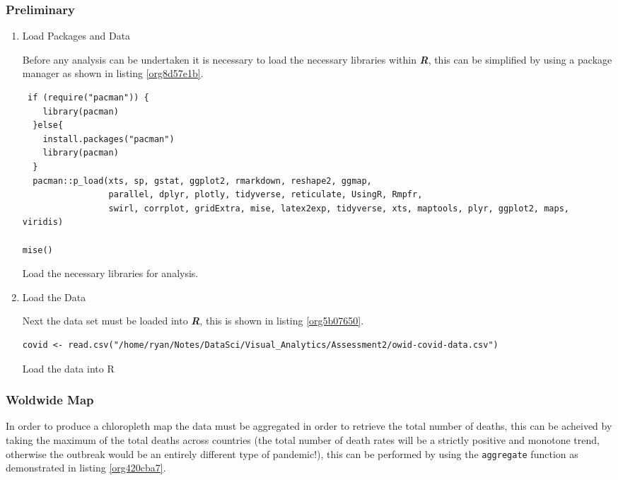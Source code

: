 \documentclass[11pt]{article}
\begin{document}
\subsubsection{Preliminary}
\label{sec:org87a2ce8}
\begin{enumerate}
\item Load Packages and Data
\label{sec:org39241de}

Before any analysis can be undertaken it is necessary to load the necessary libraries within \textbf{\emph{R}}, this can be simplified by using a package manager as shown in listing \ref{org8d57e1b}.

\begin{listing}[htbp]
\begin{verbatim}
 if (require("pacman")) {
    library(pacman)
  }else{
    install.packages("pacman")
    library(pacman)
  }
  pacman::p_load(xts, sp, gstat, ggplot2, rmarkdown, reshape2, ggmap,
                 parallel, dplyr, plotly, tidyverse, reticulate, UsingR, Rmpfr,
                 swirl, corrplot, gridExtra, mise, latex2exp, tidyverse, xts, maptools, plyr, ggplot2, maps, viridis)

mise()

\end{verbatim}
\caption{\label{org8d57e1b}Load the necessary libraries for analysis.}
\end{listing}

\item Load the Data
\label{sec:orgba27346}

Next the data set must be loaded into \textbf{\emph{R}}, this is shown in listing \ref{org5b07650}.

\begin{listing}[htbp]
\begin{verbatim}
covid <- read.csv("/home/ryan/Notes/DataSci/Visual_Analytics/Assessment2/owid-covid-data.csv")

\end{verbatim}
\caption{\label{org5b07650}Load the data into R}
\end{listing}
\end{enumerate}

\subsubsection{Woldwide Map}
\label{sec:org3a2b75d}
In order to produce a chloropleth map the data must be aggregated in order to retrieve the total number of
deaths, this can be acheived by taking the maximum of the total deaths across
countries (the total number of death rates will be a strictly positive and
monotone trend, otherwise the outbreak would be an entirely different type of
pandemic!), this can be performed by using the \texttt{aggregate} function as
demonstrated in listing \ref{org420cba7}.
\end{document}
